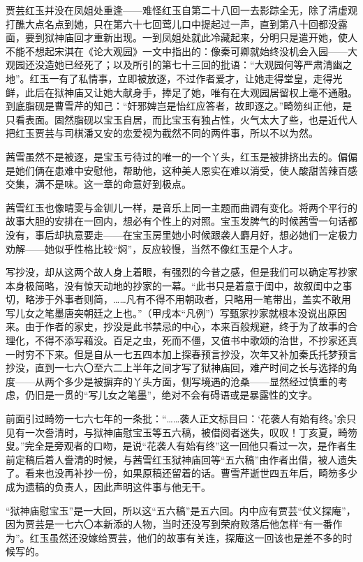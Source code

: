 \par 贾芸红玉并没在凤姐处重逢——难怪红玉自第二十八回一去影踪全无，除了清虚观打醮大点名点到她，只在第六十七回莺儿口中提起过一声，直到第八十回都没露面，要到狱神庙回才重新出现。一到凤姐处就此冷藏起来，分明只是遣开她，使人不能不想起宋淇在《论大观园》一文中指出的：像秦可卿就始终没机会入园——大观园还没造她已经死了；以及所引的第七十三回的批语：“大观园何等严肃清幽之地”。红玉一有了私情事，立即被放逐，不过作者爱才，让她走得堂皇，走得光鲜，此后在狱神庙又让她大献身手，捧足了她，唯有在大观园居留权上毫不通融。到底脂砚是曹雪芹的知己：“奸邪婢岂是怡红应答者，故即逐之。”畸笏纠正他，是只看表面。固然脂砚以宝玉自居，而比宝玉有独占性，火气太大了些，也是近代人把红玉贾芸与司棋潘又安的恋爱视为截然不同的两件事，所以不以为然。
\par 茜雪虽然不是被逐，是宝玉亏待过的唯一的一个丫头，红玉是被排挤出去的。偏偏是她们俩在患难中安慰他，帮助他，这种美人恩实在难以消受，使人酸甜苦辣百感交集，满不是味。这一章的命意好到极点。
\par 茜雪红玉也像晴雯与金钏儿一样，是音乐上同一主题而曲调有变化。将两个平行的故事大胆的安排在一回内，想必有个性上的对照。宝玉发脾气的时候茜雪一句话都没有，事后却执意要走——在宝玉房里她小时候跟袭人麝月好，想必她们一定极力劝解——她似乎性格比较“焖”，反应较慢，当然不像红玉是个人才。
\par 写抄没，却从这两个故人身上着眼，有强烈的今昔之感，但是我们可以确定写抄家本身极简略，没有惊天动地的抄家的一幕。“此书只是着意于闺中，故叙闺中之事切，略涉于外事者则简，……凡有不得不用朝政者，只略用一笔带出，盖实不敢用写儿女之笔墨唐突朝廷之上也。”（甲戌本“凡例”）写甄家抄家就根本没说出原因来。由于作者的家史，抄没是此书禁忌的中心，本来百般规避，终于为了故事的合理化，不得不添写藉没。百足之虫，死而不僵，又值书中歌颂的治世，不抄家还真一时穷不下来。但是自从一七五四本加上探春预言抄没，次年又补加秦氏托梦预言抄没，直到一七六〇至六二上半年之间才写了狱神庙回，难产时间之长与选择的角度——从两个多少是被摒弃的丫头方面，侧写境遇的沧桑——显然经过慎重的考虑，仍旧是一贯的“写儿女之笔墨”，绝对不会有碍语或是暴露性的文字。
\par 前面引过畸笏一七六七年的一条批：“……袭人正文标目曰：‘花袭人有始有终。’余只见有一次誊清时，与狱神庙慰宝玉等五六稿，被借阅者迷失，叹叹！丁亥夏，畸笏叟。”完全是旁观者的口吻，是说“花袭人有始有终”这一回他只看过一次，是作者生前定稿后着人誊清的时候，与茜雪红玉狱神庙回等“五六稿”由作者出借，被人遗失了。看来也没再补抄一份，如果原稿还留着的话。曹雪芹逝世四五年后，畸笏多少成为遗稿的负责人，因此声明这件事与他无干。
\par “狱神庙慰宝玉”是一大回，所以这“五六稿”是五六回。内中应有贾芸“仗义探庵”，因为贾芸是一七六〇本新添的人物，当时还没写到荣府败落后他怎样“有一番作为”。红玉虽然还没嫁给贾芸，他们的故事有关连，探庵这一回该也是差不多的时候写的。
